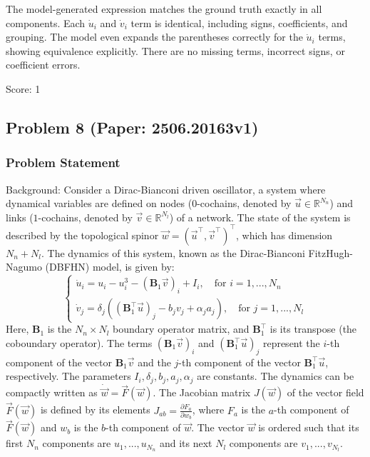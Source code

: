 \documentclass[10pt]{article}
\begin{document}
The model-generated expression matches the ground truth exactly in all components. Each \(\dot{u}_i\) and \(\dot{v}_i\) term is identical, including signs, coefficients, and grouping. The model even expands the parentheses correctly for the \(\dot{u}_i\) terms, showing equivalence explicitly. There are no missing terms, incorrect signs, or coefficient errors.

Score: 1

\newpage
\subsection*{Problem 8 (Paper: 2506.20163v1)}
\subsubsection*{Problem Statement}
Background:
Consider a Dirac-Bianconi driven oscillator, a system where dynamical variables are defined on nodes ($0$-cochains, denoted by $\vec{u} \in \mathbb{R}^{N_n}$) and links ($1$-cochains, denoted by $\vec{v} \in \mathbb{R}^{N_l}$) of a network. The state of the system is described by the topological spinor $\vec{w}=(\vec{u}^\top , \vec{v}^\top)^\top$, which has dimension $N_n+N_l$. The dynamics of this system, known as the Dirac-Bianconi FitzHugh-Nagumo (DBFHN) model, is given by:
$$
\begin{cases}
    \dot{u}_i=u_i-u_i^3-(\boldsymbol{B}_1\vec{v})_i+I_i,  \quad \text{for } i=1,...,N_n \\
    \dot{v}_j=\delta_j((\boldsymbol{B}_1^\top\vec{u})_j-b_jv_j+\alpha_j a_j), \quad \text{for } j=1,...,N_l
\end{cases}
$$
Here, $\boldsymbol{B}_1$ is the $N_n \times N_l$ boundary operator matrix, and $\boldsymbol{B}_1^\top$ is its transpose (the coboundary operator). The terms $(\boldsymbol{B}_1\vec{v})_i$ and $(\boldsymbol{B}_1^\top\vec{u})_j$ represent the $i$-th component of the vector $\boldsymbol{B}_1\vec{v}$ and the $j$-th component of the vector $\boldsymbol{B}_1^\top\vec{u}$, respectively. The parameters $I_i, \delta_j, b_j, a_j, \alpha_j$ are constants. The dynamics can be compactly written as $\dot{\vec{w}} = \vec{F}(\vec{w})$. The Jacobian matrix $J(\vec{w})$ of the vector field $\vec{F}(\vec{w})$ is defined by its elements $J_{ab} = \frac{\partial F_a}{\partial w_b}$, where $F_a$ is the $a$-th component of $\vec{F}(\vec{w})$ and $w_b$ is the $b$-th component of $\vec{w}$. The vector $\vec{w}$ is ordered such that its first $N_n$ components are $u_1, ..., u_{N_n}$ and its next $N_l$ components are $v_1, ..., v_{N_l}$.
\end{document}
